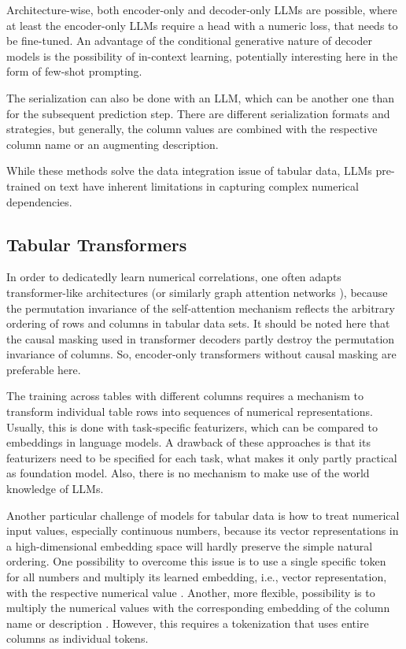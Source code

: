 \documentclass{article}
\begin{document}
Architecture-wise, both encoder-only \cite{wang2024} and decoder-only \cite{hegselmann2023,wen2024,gardner2024} LLMs are possible, where at least the encoder-only LLMs require a head with a numeric loss, that needs to be fine-tuned. An advantage of the conditional generative nature of decoder models is the possibility of in-context learning, potentially interesting here in the form of few-shot prompting.

The serialization can also be done with an LLM, which can be another one than for the subsequent prediction step. There are different serialization formats and strategies, but generally, the column values are combined with the respective column name or an augmenting description.

While these methods solve the data integration issue of tabular data, LLMs pre-trained on text have inherent limitations in capturing complex numerical dependencies.

\subsection{Tabular Transformers}
In order to dedicatedly learn numerical correlations, one often adapts transformer-like architectures \cite{wang2022,zhu2023,hollmann2023} (or similarly graph attention networks \cite{kim2024}), because the permutation invariance of the self-attention mechanism reflects the arbitrary ordering of rows and columns in tabular data sets. It should be noted here that the causal masking used in transformer decoders partly destroy the permutation invariance of columns. So, encoder-only transformers without causal masking are preferable here.

The training across tables with different columns requires a mechanism to transform individual table rows into sequences of numerical representations. Usually, this is done with task-specific featurizers, which can be compared to embeddings in language models. A drawback of these approaches is that its featurizers need to be specified for each task, what makes it only partly practical as foundation model. Also, there is no mechanism to make use of the world knowledge of LLMs.

Another particular challenge of models for tabular data is how to treat numerical input values, especially continuous numbers, because its vector representations in a high-dimensional embedding space will hardly preserve the simple natural ordering. One possibility to overcome this issue is to use a single specific token for all numbers and multiply its learned embedding, i.e., vector representation, with the respective numerical value \cite{golkar2023}. Another, more flexible, possibility is to multiply the numerical values with the corresponding embedding of the column name or description \cite{kim2024}. However, this requires a tokenization that uses entire columns as individual tokens.
\end{document}
